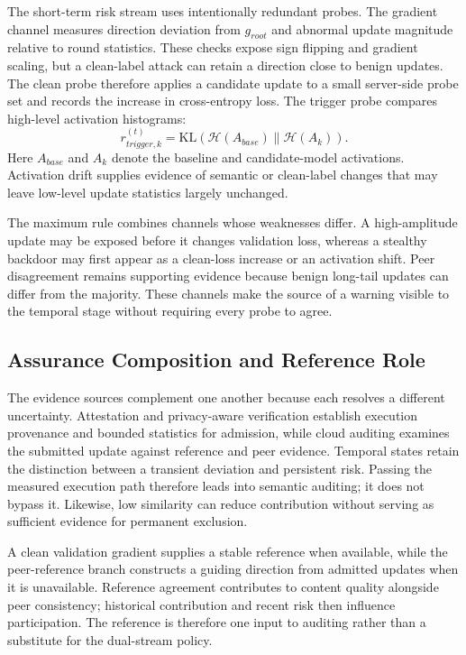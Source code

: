 \documentclass[conference,compsoc]{IEEEtran}
\begin{document}
The short-term risk stream uses intentionally redundant probes. The gradient channel measures direction deviation from $g_{root}$ and abnormal update magnitude relative to round statistics. These checks expose sign flipping and gradient scaling, but a clean-label attack can retain a direction close to benign updates. The clean probe therefore applies a candidate update to a small server-side probe set and records the increase in cross-entropy loss. The trigger probe compares high-level activation histograms:
\begin{equation}
    r_{trigger,k}^{(t)}=\mathrm{KL}\!\left(\mathcal{H}(A_{base})\|\mathcal{H}(A_k)\right).
\end{equation}
Here $A_{base}$ and $A_k$ denote the baseline and candidate-model activations. Activation drift supplies evidence of semantic or clean-label changes that may leave low-level update statistics largely unchanged.

The maximum rule combines channels whose weaknesses differ. A high-amplitude update may be exposed before it changes validation loss, whereas a stealthy backdoor may first appear as a clean-loss increase or an activation shift. Peer disagreement remains supporting evidence because benign long-tail updates can differ from the majority. These channels make the source of a warning visible to the temporal stage without requiring every probe to agree.

\subsection{Assurance Composition and Reference Role}

The evidence sources complement one another because each resolves a different uncertainty. Attestation and privacy-aware verification establish execution provenance and bounded statistics for admission, while cloud auditing examines the submitted update against reference and peer evidence. Temporal states retain the distinction between a transient deviation and persistent risk. Passing the measured execution path therefore leads into semantic auditing; it does not bypass it. Likewise, low similarity can reduce contribution without serving as sufficient evidence for permanent exclusion.

A clean validation gradient supplies a stable reference when available, while the peer-reference branch constructs a guiding direction from admitted updates when it is unavailable. Reference agreement contributes to content quality alongside peer consistency; historical contribution and recent risk then influence participation. The reference is therefore one input to auditing rather than a substitute for the dual-stream policy.
\end{document}
